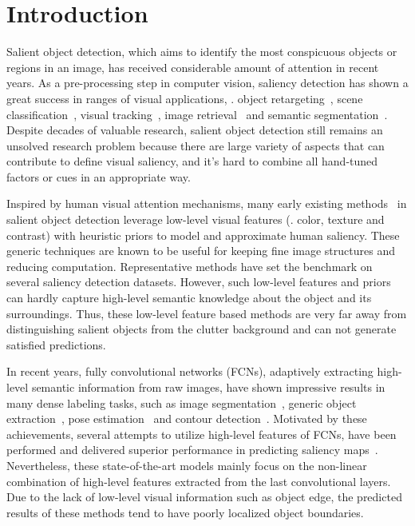 \documentclass[10pt,twocolumn,letterpaper]{article}
\begin{document}
\section{Introduction}
Salient object detection, which aims to identify the most conspicuous objects or regions in an image, has received considerable amount of attention in recent years.
As a pre-processing step in computer vision, saliency detection has shown a great success in ranges of visual applications, \eg. object retargeting~\cite{ding2011importance,sun2011scale,Vinyals2014Show}, scene classification~\cite{siagian2007rapid,ren2014region}, visual tracking~\cite{borji2012adaptive,mahadevan2013biologically}, image retrieval~\cite{he2012mobile,gao20123} and semantic segmentation~\cite{donoser2009saliency}.
Despite decades of valuable research, salient object detection still remains an unsolved research problem because there are large variety of aspects that can contribute to define visual saliency, and it's hard to combine all hand-tuned factors or cues in an appropriate way.


Inspired by human visual attention mechanisms, many early existing methods~\cite{itti98,harel07,Federico12,jiang2013salient,yan2013hierarchical,yang2013saliency} in salient object detection leverage low-level visual features (\eg. color, texture and contrast) with heuristic priors to model and approximate human saliency.
These generic techniques are known to be useful for keeping fine image structures and reducing computation.
Representative methods have set the benchmark on several saliency detection datasets.
However, such low-level features and priors can hardly capture high-level semantic knowledge about the object and its surroundings.
Thus, these low-level feature based methods are very far away from distinguishing salient objects from the clutter background and can not generate satisfied predictions. 

In recent years, fully convolutional networks (FCNs), adaptively extracting high-level semantic information from raw images, have shown impressive results in many dense labeling tasks, such as image segmentation~\cite{long2015fully,noh2015learning,dai2016instance}, generic object extraction~\cite{li2016r,hariharan2015hypercolumns}, pose estimation~\cite{yang2016end} and contour detection~\cite{xie2015holistically}.
Motivated by these achievements, several attempts to utilize high-level features of FCNs, have been performed and delivered superior performance in predicting saliency maps~\cite{lee2016deep,li2015visual,liu2016dhsnet,wang2015deep,zhao2015saliency}.
Nevertheless, these state-of-the-art models mainly focus on the non-linear combination of high-level features extracted from the last convolutional layers.
Due to the lack of low-level visual information such as object edge, the predicted results of these methods tend to have poorly localized object boundaries.
\end{document}
